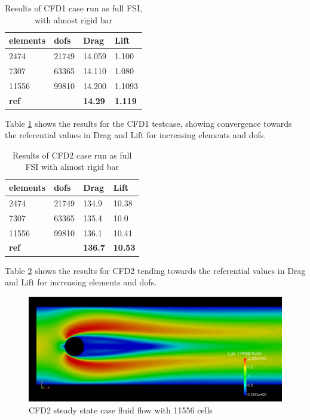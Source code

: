 \begin{table}[H]
\centering
\caption{Results of CFD1 case run as full FSI, with almost rigid bar}
\label{tab:CFD1}
\begin{tabular}{|l|l|l|l|}
\hline
\textbf{elements} & \textbf{dofs} & \textbf{Drag} & \textbf{Lift} \\ \hline
2474 & 21749 & 14.059 & 1.100 \\ \hline
7307 & 63365 & 14.110 & 1.080 \\ \hline
11556 & 99810 & 14.200 & 1.1093 \\ \hline
\textbf{ref} & \textbf{} & \textbf{14.29} & \textbf{1.119} \\ \hline
\end{tabular}
\end{table}

Table \ref{tab:CFD1} shows the results for the CFD1 testcase, showing convergence towards the referential values in Drag and Lift for increasing elements and dofs.

\begin{table}[H]
\centering
\caption{Results of CFD2 case run as full FSI with almost rigid bar}
\label{tab:CFD2}
\begin{tabular}{|l|l|l|l|}
\hline
\textbf{elements} & \textbf{dofs} & \textbf{Drag} & \textbf{Lift} \\ \hline
2474 & 21749 & 134.9 & 10.38 \\ \hline
7307 & 63365 & 135.4 & 10.0 \\ \hline
11556 & 99810 & 136.1 & 10.41 \\ \hline
\textbf{ref} & \textbf{} & \textbf{136.7} & \textbf{10.53} \\ \hline
\end{tabular}
\end{table}

Table \ref{tab:CFD2} shows the results for CFD2 tending towards the referential values in Drag and Lift for increasing elements and dofs.

\begin{figure}[H]
\label{fig:CFD2}
\includegraphics[scale=0.45, trim={9mm 0mm 0mm 10mm},clip]{./Verification_Validation/Hron_Turek/CFD2.png}
\caption{CFD2 steady state case fluid flow with 11556 cells}
\end{figure}

